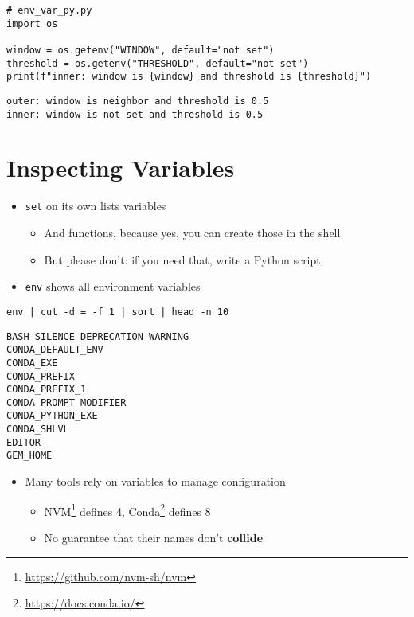 \documentclass[krantzl]{krantz}
\newcommand{\glossref}[1]{\textbf{#1}}
\newcommand{\hreffoot}[2]{{#1}\footnote{\href{#2}{#2}}}
\begin{document}
\begin{lstlisting}[frame=tblr]
# env_var_py.py
import os

window = os.getenv("WINDOW", default="not set")
threshold = os.getenv("THRESHOLD", default="not set")
print(f"inner: window is {window} and threshold is {threshold}")
\end{lstlisting}

\begin{lstlisting}[frame=tblr,backgroundcolor=\color{black!5}]
outer: window is neighbor and threshold is 0.5
inner: window is not set and threshold is 0.5
\end{lstlisting}

\section{Inspecting Variables}
\begin{itemize}
\item \texttt{set} on its own lists variables\begin{itemize}
\item And functions, because yes, you can create those in the shell

\item But please don’t: if you need that, write a Python script

\end{itemize}


\item \texttt{env} shows all environment variables

\end{itemize}
\begin{lstlisting}[frame=tblr]
env | cut -d = -f 1 | sort | head -n 10
\end{lstlisting}

\begin{lstlisting}[frame=tblr,backgroundcolor=\color{black!5}]
BASH_SILENCE_DEPRECATION_WARNING
CONDA_DEFAULT_ENV
CONDA_EXE
CONDA_PREFIX
CONDA_PREFIX_1
CONDA_PROMPT_MODIFIER
CONDA_PYTHON_EXE
CONDA_SHLVL
EDITOR
GEM_HOME
\end{lstlisting}

\begin{itemize}
\item Many tools rely on variables to manage configuration\begin{itemize}
\item \hreffoot{NVM}{https://github.com/nvm-sh/nvm} defines 4, \hreffoot{Conda}{https://docs.conda.io/} defines 8

\item No guarantee that their names don’t \glossref{collide}

\end{itemize}


\end{itemize}
\end{document}
